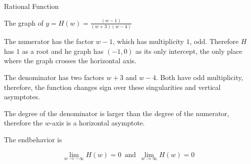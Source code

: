 \documentclass{ximera}
\begin{document}
\begin{example} Rational Function


The graph of $y = H(w) = \frac{(w-1)}{(w+3) (w-4)} $


\begin{image}
\end{image}



The numerator has the factor $w-1$, which has multiplicity $1$, odd.  Therefore $H$ has $1$ as a root and he graph has $(-1,0)$ as its only intercept, the only place where the graph crosses the horizontal axis.


The denominator has two factors $w+3$ and $w-4$.  Both have odd multiplicity, therefore, the function changes sign over these singularities and vertical asymptotes.


The degree of the denominator is larger than the degree of the numerator, therefore the $w$-axis is a horizontal asymptote.



The endbehavior is



\[       \lim_{w \to -\infty} H(w) = 0   \, \text{ and } \,    \lim_{w \to \infty} H(w) = 0               \]






\end{example}
\end{document}
